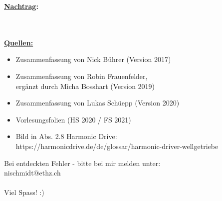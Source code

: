 \documentclass[numerate]{cheatsheet}
\begin{document}
    \newpage
    \par \vspace{2mm} \huge{\textbf{\underline{Nachtrag}:}}
    \\ \vspace{2mm} \begin{footnotesize}
        \\~\\\textbf{\underline{Quellen:}}
        \begin{itemize}
            \item Zusammenfassung von Nick Bührer (Version 2017)
            \item Zusammenfassung von Robin Frauenfelder, \\ergänzt durch Micha Bosshart (Version 2019)
            \item Zusammenfassung von Lukas Schüepp (Version 2020)
            \item Vorlesungsfolien (HS 2020 / FS 2021)
            \item Bild in Abs. 2.8 Harmonic Drive: 
            \\https://harmonicdrive.de/de/glossar/harmonic-driver-wellgetriebe
        \end{itemize}

        \vspace{5mm}
        Bei entdeckten Fehler - bitte bei mir melden unter:
        \\nischmidt$@$ethz.ch
        \\~\\ \vspace{3mm} Viel Spass! :)

    \end{footnotesize}
\end{document}
